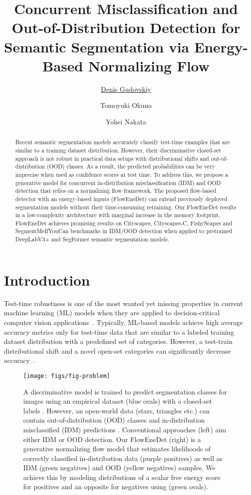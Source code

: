 \documentclass[accepted, startpage]{uai2023}
\title{Concurrent Misclassification and Out-of-Distribution Detection for \\ Semantic Segmentation via Energy-Based Normalizing Flow}
\author[1]{\href{mailto:<denis.gudovskiy@us.panasonic.com>?Subject=Your UAI 2023 paper}{Denis Gudovskiy}{}}
\author[2]{Tomoyuki Okuno}
\author[2]{Yohei Nakata}
\affil[1]{Panasonic AI Lab, Mountain View, CA, USA
}
\affil[2]{Panasonic Holdings Corporation, Osaka, Japan
}
\newcommand{\etc}{etc.}
\begin{document}
\maketitle


\begin{abstract}
Recent semantic segmentation models accurately classify test-time examples that are similar to a training dataset distribution. However, their discriminative closed-set approach is not robust in practical data setups with distributional shifts and out-of-distribution (OOD) classes. As a result, the predicted probabilities can be very imprecise when used as confidence scores at test time. To address this, we propose a generative model for concurrent in-distribution misclassification (IDM) and OOD detection that relies on a normalizing flow framework. The proposed flow-based detector with an energy-based inputs (FlowEneDet) can extend previously deployed segmentation models without their time-consuming retraining. Our FlowEneDet results in a low-complexity architecture with marginal increase in the memory footprint. FlowEneDet achieves promising results on Cityscapes, Cityscapes-C, FishyScapes and SegmentMeIfYouCan benchmarks in IDM/OOD detection when applied to pretrained DeepLabV3+ and SegFormer semantic segmentation models.
\end{abstract}

\section{Introduction}\label{sec:intro}
Test-time robustness is one of the most wanted yet missing properties in current machine learning (ML) models when they are applied to decision-critical computer vision applications~\citep{unsolved-ml}. Typically, ML-based models achieve high average accuracy metrics only for test-time data that are similar to a labeled training dataset distribution with a predefined set of categories. However, a test-train distributional shift and a novel open-set categories can significantly decrease accuracy~\citep{croce2021robustbench}. 

\begin{figure}[t]
	\centering
	\texttt{[image: figs/fig-problem]}
	\caption{A discriminative model  is trained to predict segmentation classes  for images  using an empirical dataset  (blue ovals) with a closed-set labels . However, an open-world data  (stars, triangles \etc) can contain out-of-distribution (OOD) classes  and in-distribution misclassified (IDM) predictions . Conventional approaches (left) aim either IDM or OOD detection. Our FlowEneDet (right) is a generative normalizing flow model that estimates likelihoods of correctly classified in-distribution data (purple positives) as well as IDM (green negatives) and OOD (yellow negatives) samples. We achieve this by modeling distributions of a scalar free energy score  for positives and an opposite  for negatives using  (green ovals).}\label{fig:problem}
\end{figure}
\end{document}

